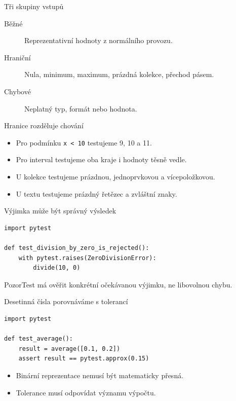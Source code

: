 \documentclass[aspectratio=169]{beamer}
\begin{document}
\begin{frame}{Tři skupiny vstupů}
\begin{description}
\item[Běžné] Reprezentativní hodnoty z normálního provozu.
\item[Hraniční] Nula, minimum, maximum, prázdná kolekce, přechod pásem.
\item[Chybové] Neplatný typ, formát nebo hodnota.
\end{description}
\end{frame}

\begin{frame}{Hranice rozděluje chování}
\begin{itemize}
\item Pro podmínku \texttt{x < 10} testujeme 9, 10 a 11.
\item Pro interval testujeme oba kraje i hodnoty těsně vedle.
\item U kolekce testujeme prázdnou, jednoprvkovou a vícepoložkovou.
\item U textu testujeme prázdný řetězec a zvláštní znaky.
\end{itemize}
\end{frame}

\begin{frame}[fragile]{Výjimka může být správný výsledek}
\begin{lstlisting}[style=python]
import pytest

def test_division_by_zero_is_rejected():
    with pytest.raises(ZeroDivisionError):
        divide(10, 0)
\end{lstlisting}
\begin{block}{Pozor}Test má ověřit konkrétní očekávanou výjimku, ne libovolnou chybu.\end{block}
\end{frame}

\begin{frame}[fragile]{Desetinná čísla porovnáváme s tolerancí}
\begin{lstlisting}[style=python]
import pytest

def test_average():
    result = average([0.1, 0.2])
    assert result == pytest.approx(0.15)
\end{lstlisting}
\begin{itemize}
\item Binární reprezentace nemusí být matematicky přesná.
\item Tolerance musí odpovídat významu výpočtu.
\end{itemize}
\end{frame}
\end{document}
